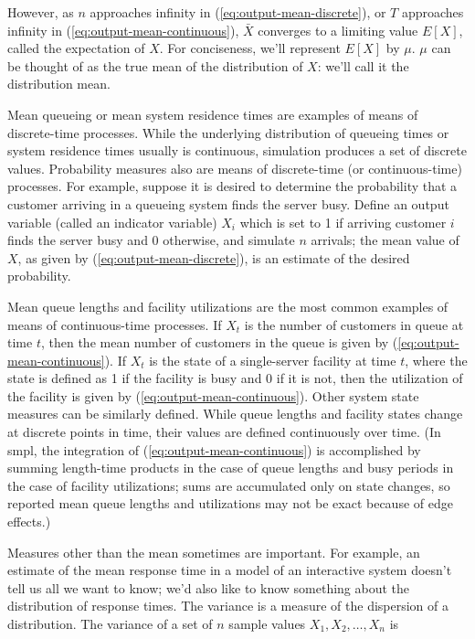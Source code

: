 However, as $n$ approaches infinity in (\ref{eq:output-mean-discrete}), or $T$
approaches infinity in (\ref{eq:output-mean-continuous}), $\bar{X}$ converges to
a limiting value $E[X]$, called the expectation of $X$. For conciseness, we'll
represent $E[X]$ by $\mu$. $\mu$ can be thought of as the true mean of the
distribution of $X$: we'll call it the distribution mean.

Mean queueing or mean system residence times are examples of means of
discrete-time processes. While the underlying distribution of queueing times
or system residence times usually is continuous, simulation produces a set of
discrete values. Probability measures also are means of discrete-time (or
continuous-time) processes. For example, suppose it is desired to determine
the probability that a customer arriving in a queueing system finds the server
busy. Define an output variable (called an indicator variable) $X_i$ which is
set to 1 if arriving customer $i$ finds the server busy and 0 otherwise, and
simulate $n$ arrivals; the mean value of $X$, as given by
(\ref{eq:output-mean-discrete}), is an estimate of the desired probability.

Mean queue lengths and facility utilizations are the most common examples of
means of continuous-time processes. If $X_t$ is the number of customers in
queue at time $t$, then the mean number of customers in the queue is given by
(\ref{eq:output-mean-continuous}). If $X_t$ is the state of a single-server
facility at time $t$, where the state is defined as 1 if the facility is busy
and 0 if it is not, then the utilization of the facility is given by
(\ref{eq:output-mean-continuous}). Other system state measures can be similarly
defined. While queue lengths and facility states change at discrete points in
time, their values are defined continuously over time. (In smpl, the
integration of (\ref{eq:output-mean-continuous}) is accomplished by summing
length-time products in the case of queue lengths and busy periods in the case
of facility utilizations; sums are accumulated only on state changes, so
reported mean queue lengths and utilizations may not be exact because of edge
effects.)

Measures other than the mean sometimes are important. For example, an estimate
of the mean response time in a model of an interactive system doesn't tell us
all we want to know; we'd also like to know something about the distribution
of response times. The variance is a measure of the dispersion of a
distribution. The variance of a set of $n$ sample values $X_1, X_2, \ldots, X_n$
is

